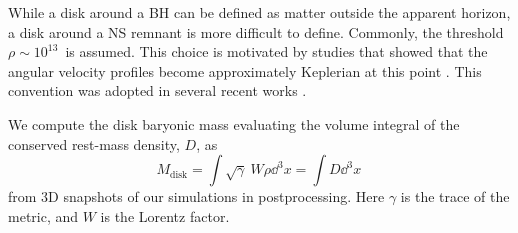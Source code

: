 

While a disk around a \ac{BH} can be defined as matter outside the apparent 
horizon, a disk around a \ac{NS} remnant is more difficult to define. Commonly, the 
threshold $\rho\sim 10^{13}\,$\gcm{} is assumed. This choice is motivated by studies that 
showed that the angular velocity profiles become approximately Keplerian at this point 
\citep[\eg][]{Shibata:2005ss,Shibata:2006nm,Hanauske:2016gia,Kastaun:2016elu}.
This convention was adopted in several recent works 
\citep{Radice:2018pdn,Kiuchi:2019lls,Vincent:2019kor}.
%
%
%


We compute the disk baryonic mass evaluating
the volume integral of the conserved rest-mass density, $D$, as 
%
\begin{equation}
\label{eq:method:mdisk}
M_{\text{disk}} = \int \sqrt{\gamma}~W\rho \dd^3 x  = \int D \dd^3 x\, 
\end{equation}
%
from $3$D snapshots of our simulations in postprocessing.
%
Here $\gamma$ is the trace of the metric, and $W$ is the Lorentz factor. 


